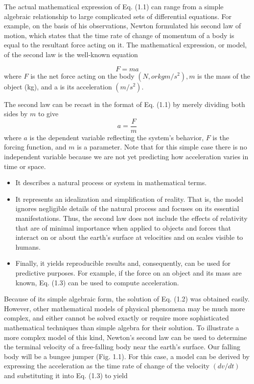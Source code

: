 \documentclass[../main.tex]{subfiles}
\begin{document}
The actual mathematical expression of Eq. (1.1) can range from a simple algebraic
relationship to large complicated sets of differential equations. For example, on the basis of
his observations, Newton formulated his second law of motion, which states that the time
rate of change of momentum of a body is equal to the resultant force acting on it. The mathematical expression, or model, of the second law is the well-known equation

\begin{equation}
\tag{1.2}
F=ma
\end{equation}
where $F$ is the net force acting on the body $(N, or kg m/s^2
), m$ is the mass of the object (kg),
and a is its acceleration $(m/s^2
)$.

The second law can be recast in the format of Eq. (1.1) by merely dividing both sides
by $m$ to give
\begin{equation}
\tag{1.3}
a=\dfrac{F}{m}
\end{equation}
where $a$ is the dependent variable reflecting the system's behavior, $F$ is the forcing function, and $m$ is a parameter. Note that for this simple case there is no independent variable
because we are not yet predicting how acceleration varies in time or space.

\begin{itemize}
\item  It describes a natural process or system in mathematical terms.
\item It represents an idealization and simplification of reality. That is, the model ignores negligible details of the natural process and focuses on its essential manifestations. Thus,
the second law does not include the effects of relativity that are of minimal importance
when applied to objects and forces that interact on or about the earth's surface at velocities and on scales visible to humans.
\item  Finally, it yields reproducible results and, consequently, can be used for predictive purposes. For example, if the force on an object and its mass are known, Eq. (1.3) can be
used to compute acceleration.

\end{itemize}


Because of its simple algebraic form, the solution of Eq. (1.2) was obtained easily.
However, other mathematical models of physical phenomena may be much more complex,
and either cannot be solved exactly or require more sophisticated mathematical techniques
than simple algebra for their solution. To illustrate a more complex model of this kind,
Newton's second law can be used to determine the terminal velocity of a free-falling body
near the earth's surface. Our falling body will be a bungee jumper (Fig. 1.1). For this case,
a model can be derived by expressing the acceleration as the time rate of change of the
velocity $(dv/dt)$ and substituting it into Eq. (1.3) to yield
\end{document}
